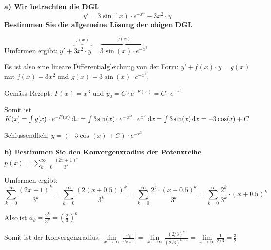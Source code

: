 \textbf{a) Wir betrachten die DGL}
\[y' = 3 \sin(x) \cdot e^{-x^3} - 3x^2 \cdot y\]
\textbf{Bestimmen Sie die allgemeine Lösung der obigen DGL}

Umformen ergibt: $y' + \overbrace{3x^2 \cdot y}^{f(x)} = \overbrace{3 \sin(x) \cdot e^{-x^3}}^{g(x)}$

Es ist also eine lineare Differentialgleichung von der Form: $y' + f(x) \cdot y = g(x)$ mit $f(x) = 3x^2$ und $g(x) = 3\sin(x) \cdot e^{-x^3}$.

Gemäss Rezept: $F(x) = x^3$ und $y_0 = C \cdot e^{-F(x)} = C \cdot e^{-x^3}$

Somit ist $K(x) = \int g(x) \cdot e^{-F(x)} \,\mathrm{d}x = \int 3 \sin(x) \cdot e^{-x^3} \cdot e^{x^3} \,\mathrm{d}x = \int 3 \sin(x) \,\mathrm{d}x = -3 \cos(x) + C$

Schlussendlich: $y = (-3 \cos(x) + C) \cdot e^{-x^3}$

\textbf{b) Bestimmen Sie den Konvergenzradius der Potenzreihe} $\displaystyle p(x) = \sum \limits_{k = 0}^{\infty} \frac{(2x + 1)^k}{3^k}$

Umformen ergibt:
\[\sum \limits_{k=0}^\infty \frac{(2x + 1)^k}{3^k} = \sum \limits_{k=0}^\infty \frac{(2(x + 0.5))^k}{3^k} = \sum \limits_{k=0}^\infty \frac{2^k \cdot (x + 0.5)^k}{3^k} = \sum \limits_{k=0}^\infty \frac{2^k}{3^k} \cdot (x + 0.5)^k\]

Also ist $\displaystyle a_k = \frac{2^k}{3^k} = \left( \frac{2}{3} \right)^k$

Somit ist der Konvergenzradius: $\displaystyle \lim \limits_{x \to \infty} \left| \frac{a_k}{a_{k+1}} \right| = \lim \limits_{x \to \infty} \frac{(2/3)^k}{(2/3)^{k+1}} = \lim \limits_{x \to \infty} \frac{1}{2/3} = \frac{3}{2}$